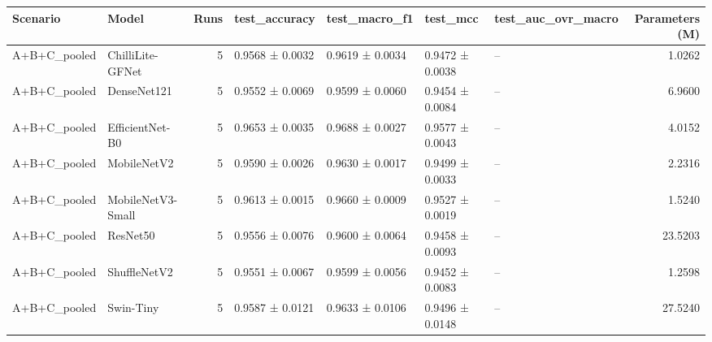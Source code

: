 \begin{tabular}{llrllllr}
\toprule
Scenario & Model & Runs & test\_accuracy & test\_macro\_f1 & test\_mcc & test\_auc\_ovr\_macro & Parameters (M) \\
\midrule
A+B+C\_pooled & ChilliLite-GFNet & 5 & 0.9568 ± 0.0032 & 0.9619 ± 0.0034 & 0.9472 ± 0.0038 & -- & 1.0262 \\
A+B+C\_pooled & DenseNet121 & 5 & 0.9552 ± 0.0069 & 0.9599 ± 0.0060 & 0.9454 ± 0.0084 & -- & 6.9600 \\
A+B+C\_pooled & EfficientNet-B0 & 5 & 0.9653 ± 0.0035 & 0.9688 ± 0.0027 & 0.9577 ± 0.0043 & -- & 4.0152 \\
A+B+C\_pooled & MobileNetV2 & 5 & 0.9590 ± 0.0026 & 0.9630 ± 0.0017 & 0.9499 ± 0.0033 & -- & 2.2316 \\
A+B+C\_pooled & MobileNetV3-Small & 5 & 0.9613 ± 0.0015 & 0.9660 ± 0.0009 & 0.9527 ± 0.0019 & -- & 1.5240 \\
A+B+C\_pooled & ResNet50 & 5 & 0.9556 ± 0.0076 & 0.9600 ± 0.0064 & 0.9458 ± 0.0093 & -- & 23.5203 \\
A+B+C\_pooled & ShuffleNetV2 & 5 & 0.9551 ± 0.0067 & 0.9599 ± 0.0056 & 0.9452 ± 0.0083 & -- & 1.2598 \\
A+B+C\_pooled & Swin-Tiny & 5 & 0.9587 ± 0.0121 & 0.9633 ± 0.0106 & 0.9496 ± 0.0148 & -- & 27.5240 \\
\bottomrule
\end{tabular}
